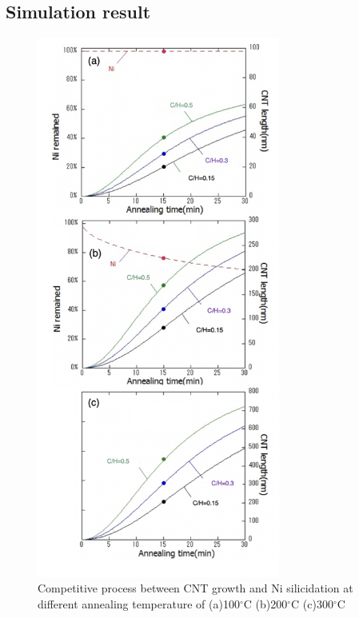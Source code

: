 \subsection{Simulation result }
\begin{figure}[H]
\centering
\includegraphics[width=8cm]{src/fig/fig41.png}
\caption{Competitive process between CNT growth and Ni silicidation at different annealing temperature of (a)100\(^\circ\)C (b)200\(^\circ\)C (c)300\(^\circ\)C}
\end{figure}


